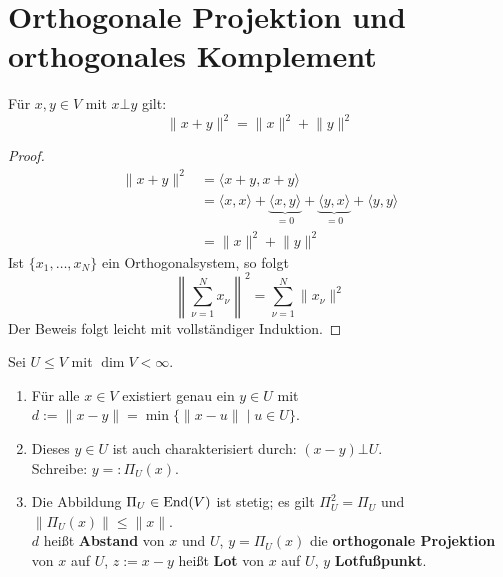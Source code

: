 \documentclass[parskip,a4paper,twoside,DIV15,BCOR12mm]{scrbook}
\begin{document}
\section{Orthogonale Projektion und orthogonales Komplement}
\begin{theo}
\label{Satz 17.3}
Für \(x,y\in V\) mit \(x\bot y\) gilt:
\[
\lVert x+y\rVert^{2}=\lVert x\rVert^{2}+\lVert y\rVert^{2}
\]
\end{theo}
\begin{proof}
\begin{align*}
\lVert x+y\rVert^{2}&=\langle x+y,x+y\rangle\\
&=\langle x,x\rangle+\underbrace{\langle x,y\rangle}_{=0}+
    \underbrace{\langle y,x\rangle}_{=0}+\langle y,y\rangle\\
&=\lVert x\rVert^{2}+\lVert y\rVert^{2}
\end{align*}
Ist \(\{x_{1},\ldots,x_{N}\}\) ein Orthogonalsystem, so folgt
\[
\left\lVert\sum_{\nu=1}^{N}{x_{\nu}}\right\rVert^{2}=\sum_{\nu=1}^{N}\lVert x_{\nu}\rVert^{2}
\]
Der Beweis folgt leicht mit vollständiger Induktion.
\end{proof}
\begin{theo}
\label{Satz 17.4}
Sei \(U\leq V\) mit \(\dim V<\infty\).
\begin{enumerate}
\item Für alle \(x\in V\) existiert genau ein \(y\in U\) mit 
\(d:=\lVert x-y\rVert=\min\{\lVert x-u\rVert\mid u\in U\}\).
\item Dieses \(y\in U\) ist auch charakterisiert durch: \((x-y)\bot U\).\\
Schreibe: \(y=:\Pi_{U}(x)\).
\item Die Abbildung \(\Pi_{U}\in\operatorname{End}(V)\) ist stetig; es gilt 
\(\Pi_{U}^{2}=\Pi_{U}\) und \(\lVert\Pi_{U}(x)\rVert\leq\lVert x\rVert\).\\
\(d\) heißt \textbf{Abstand} von \(x\) und \(U\), \(y=\Pi_{U}(x)\) die
\textbf{orthogonale Projektion} von \(x\) auf \(U\), \(z:=x-y\) heißt 
\textbf{Lot} von \(x\) auf \(U\), \(y\) \textbf{Lotfußpunkt}.
\end{enumerate}
\end{theo}
\end{document}
